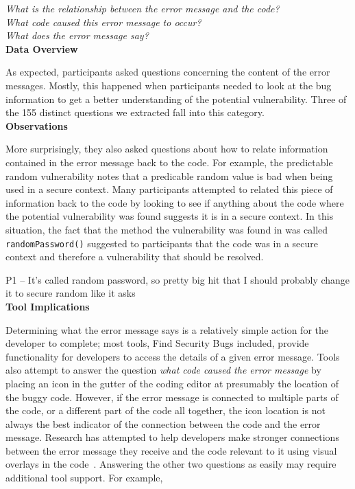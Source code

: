 \documentclass[conference]{IEEEtran}
\begin{document}
\noindent\emph{What is the relationship between the error message and the code?} \\
\emph{What code caused this error message to occur?} \\
\emph{What does the error message say?} \\


\noindent\textbf{Data Overview}

As expected, participants asked questions concerning the content of the error messages. 
Mostly, this happened when participants needed to look at the bug information to get a better understanding of the potential vulnerability. 
Three of the 155 distinct questions we extracted fall into this category.
\\

\noindent\textbf{Observations}

More surprisingly, they also asked questions about how to relate information contained in the error message back to the code. 
For example, the predictable random vulnerability notes that a predicable random value is bad when being used in a secure context. 
Many participants attempted to related this piece of information back to the code by looking to see if anything about the code where the potential vulnerability was found suggests it is in a secure context. 
In this situation, the fact that the method the vulnerability was found in was called \texttt{randomPassword()} suggested to participants that the code was in a secure context and therefore a vulnerability that should be resolved.

P1 -- It's called random password, so pretty big hit that I should probably change it to secure random like it asks
\\

\noindent\textbf{Tool Implications}

Determining what the error message says is a relatively simple action for the developer to complete; most tools, Find Security Bugs included, provide functionality for developers to access the details of a given error message. 
Tools also attempt to answer the question \emph{what code caused the error message} by placing an icon in the gutter of the coding editor at presumably the location of the buggy code. 
However, if the error message is connected to multiple parts of the code, or a different part of the code all together, the icon location is not always the best indicator of the connection between the code and the error message. 
Research has attempted to help developers make stronger connections between the error message they receive and the code relevant to it using visual overlays in the code~\cite{barik14visual}.
Answering the other two questions as easily may require additional tool support. For example, 
\end{document}
